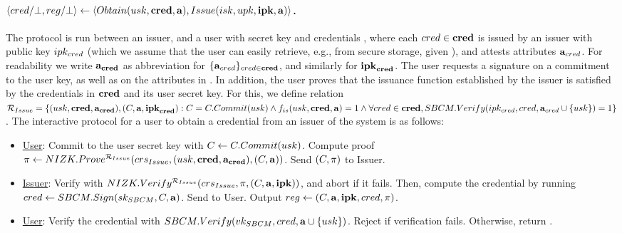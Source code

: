 \paragraph{$\langle cred/\bot,reg/\bot \rangle \gets
  \langle Obtain(usk,\mathbf{cred},\mathbf{a}),Issue(isk,upk,\mathbf{ipk},\mathbf{a})\rangle$.} %
The protocol is run between an issuer, and a user with secret key \usk and
credentials \scred, where each $cred \in \mathbf{cred}$ is issued by an issuer with
public key $ipk_{cred}$ (which we assume that the user can easily retrieve,
e.g., from secure storage, given \cred), and attests attributes
$\mathbf{a}_{cred}$. For readability we write $\mathbf{a}_{\mathbf{cred}}$ as abbreviation for
$\lbrace \mathbf{a}_{cred} \rbrace_{cred \in \mathbf{cred}}$, and similarly for
$\mathbf{ipk}_{\mathbf{cred}}$. The user requests a signature on a commitment to the user key,
as well as on the attributes in \attrs. In addition, the user proves that the
issuance function \fissue established by the issuer is satisfied by the
credentials in $\mathbf{cred}$
and its user secret key. For this, we define relation $\mathcal{R}_{Issue} = \lbrace
(usk,\mathbf{cred},\mathbf{a}_{\mathbf{cred}}), (C,\mathbf{a},\mathbf{ipk}_{\mathbf{cred}}): C = C.Commit(usk) \land
f_{is}(usk,\mathbf{cred},\mathbf{a}) = 1 \land \forall cred \in \mathbf{cred},
SBCM.Verify(ipk_{cred},cred,
\mathbf{a}_{cred} \cup \lbrace usk \rbrace) = 1 \rbrace$. The interactive protocol
for a user to obtain a credential from an issuer of the system is as follows:

\begin{itemize}
\item \uline{User}: Commit to the user secret key with $C \gets
  C.Commit(usk)$. Compute proof $\pi \gets
  NIZK.Prove^{\mathcal{R}_{Issue}}(crs_{Issue},(usk,\mathbf{cred},\mathbf{a}_{\mathbf{cred}}),
  (C,\mathbf{a}))$. Send $(C,\pi)$ to Issuer.
\item \uline{Issuer}: Verify \NIZKproof with $NIZK.Verify^{\mathcal{R}_{Issue}}
  (crs_{Issue},\pi,(C,\mathbf{a},\mathbf{ipk}))$, and abort if it fails. Then,
  compute the credential by running $cred \gets SBCM.Sign(sk_{SBCM},C,
  \mathbf{a})$. Send \cred to User. Output $reg \gets (C,\mathbf{a},\mathbf{ipk},
  cred,\pi)$.
\item \uline{User}: Verify the credential with $SBCM.Verify(vk_{SBCM},cred,
  \mathbf{a} \cup \lbrace usk \rbrace)$. Reject if verification fails.
  Otherwise, return \cred.
\end{itemize}

